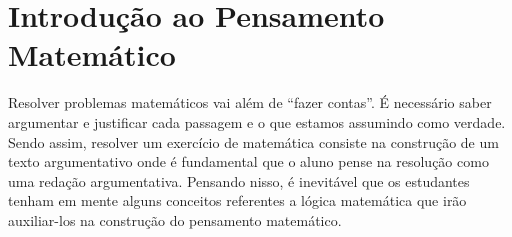 \chapter{Introdução ao Pensamento Matemático}
\label{cap:Introducao_Pensamento_Matematico}

\minitoc

Resolver problemas matemáticos vai além de ``fazer contas''. É necessário saber
argumentar e justificar cada passagem e o que estamos assumindo como verdade.
Sendo assim, resolver um exercício de matemática consiste na construção de um
texto argumentativo onde é fundamental que o aluno pense na resolução como uma
redação argumentativa. Pensando nisso, é inevitável que os estudantes tenham em
mente alguns conceitos referentes a lógica matemática que irão auxiliar-los na
construção do pensamento matemático.








